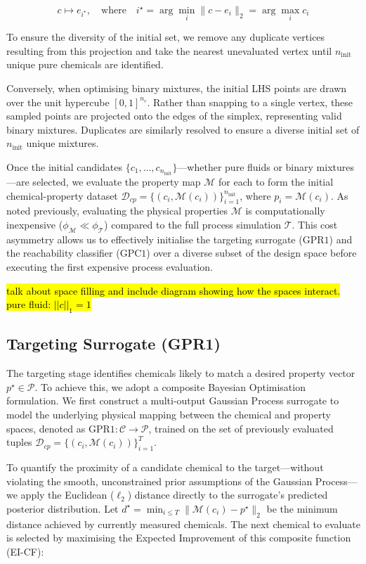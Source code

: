 \documentclass[preprint,12pt]{elsarticle}
\begin{document}
$$c \longmapsto e_{i^\star}, \quad \text{where} \quad i^\star = \arg\min_{i} \lVert c - e_i \rVert_2 = \arg\max_i c_i$$


To ensure the diversity of the initial set, we remove any duplicate vertices resulting from this projection and take the nearest unevaluated vertex until $n_{\text{init}}$ unique pure chemicals are identified.

Conversely, when optimising binary mixtures, the initial LHS points are drawn over the unit hypercube $[0,1]^{n_c}$. Rather than snapping to a single vertex, these sampled points are projected onto the edges of the simplex, representing valid binary mixtures. Duplicates are similarly resolved to ensure a diverse initial set of $n_{\text{init}}$ unique mixtures.

Once the initial candidates $\{c_1, \dots, c_{n_{\text{init}}}\}$—whether pure fluids or binary mixtures—are selected, we evaluate the property map $\mathcal{M}$ for each to form the initial chemical-property dataset $\mathcal{D}_{cp} = \{ (c_i, \mathcal{M}(c_i)) \}_{i=1}^{n_{\text{init}}}$, where $p_i = \mathcal{M}(c_i)$. As noted previously, evaluating the physical properties $\mathcal{M}$ is computationally inexpensive ($\phi_\mathcal{M} \ll \phi_\mathcal{T}$) compared to the full process simulation $\mathcal{T}$. This cost asymmetry allows us to effectively initialise the targeting surrogate ($\mathrm{GPR1}$) and the reachability classifier ($\mathrm{GPC1}$) over a diverse subset of the design space before executing the first expensive process evaluation.


\hl{talk about space filling and include diagram showing how the spaces interact. pure fluid: $||c||_{1}=1$}


\subsection{Targeting Surrogate (GPR1)}
\label{sec:targeting}

The targeting stage identifies chemicals likely to match a desired property vector $p^\star \in \mathcal{P}$. To achieve this, we adopt a composite Bayesian Optimisation formulation. We first construct a multi-output Gaussian Process surrogate to model the underlying physical mapping between the chemical and property spaces, denoted as $\mathrm{GPR1}: \mathcal{C} \rightarrow \mathcal{P}$, trained on the set of previously evaluated tuples $\mathcal{D}_{cp} = \{ (c_i, \mathcal{M}(c_i)) \}_{i=1}^T$.

To quantify the proximity of a candidate chemical to the target—without violating the smooth, unconstrained prior assumptions of the Gaussian Process—we apply the Euclidean ($\ell_2$) distance directly to the surrogate's predicted posterior distribution. Let $d^\star = \min_{i \le T} \lVert \mathcal{M}(c_i) - p^\star \rVert_2$ be the minimum distance achieved by currently measured chemicals. The next chemical to evaluate is selected by maximising the Expected Improvement of this composite function (EI-CF):
\end{document}
